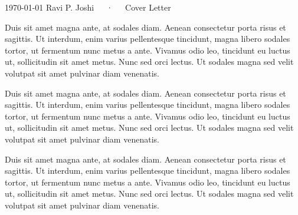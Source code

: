 \documentclass[11pt, a4paper]{awesome-cv}
\begin{document}
\makecvheader[R]

\makecvfooter
  {\today}
  {Ravi P. Joshi~~~·~~~Cover Letter}
  {}

\makelettertitle

\begin{cvletter}

Duis sit amet magna ante, at sodales diam. Aenean consectetur porta risus et sagittis. Ut interdum, enim varius pellentesque tincidunt, magna libero sodales tortor, ut fermentum nunc metus a ante. Vivamus odio leo, tincidunt eu luctus ut, sollicitudin sit amet metus. Nunc sed orci lectus. Ut sodales magna sed velit volutpat sit amet pulvinar diam venenatis.

Duis sit amet magna ante, at sodales diam. Aenean consectetur porta risus et sagittis. Ut interdum, enim varius pellentesque tincidunt, magna libero sodales tortor, ut fermentum nunc metus a ante. Vivamus odio leo, tincidunt eu luctus ut, sollicitudin sit amet metus. Nunc sed orci lectus. Ut sodales magna sed velit volutpat sit amet pulvinar diam venenatis.

Duis sit amet magna ante, at sodales diam. Aenean consectetur porta risus et sagittis. Ut interdum, enim varius pellentesque tincidunt, magna libero sodales tortor, ut fermentum nunc metus a ante. Vivamus odio leo, tincidunt eu luctus ut, sollicitudin sit amet metus. Nunc sed orci lectus. Ut sodales magna sed velit volutpat sit amet pulvinar diam venenatis.

\end{cvletter}


\makeletterclosing
\end{document}
